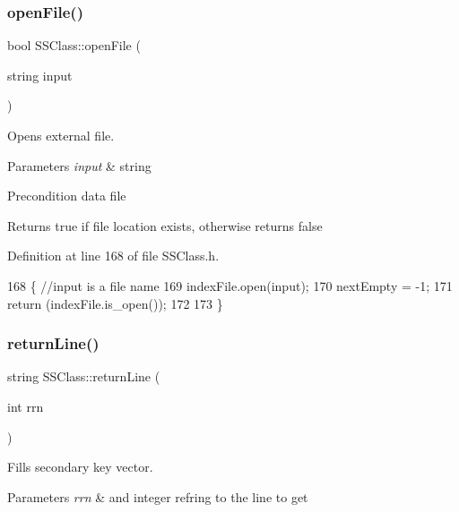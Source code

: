 \subsubsection{\texorpdfstring{open\+File()}{openFile()}}
{\footnotesize\ttfamily bool S\+S\+Class\+::open\+File (\begin{DoxyParamCaption}\item[{string}]{input }\end{DoxyParamCaption})}



Opens external file. 


\begin{DoxyParams}{Parameters}
{\em input} & string \\
\hline
\end{DoxyParams}
\begin{DoxyPrecond}{Precondition}
data file 
\end{DoxyPrecond}
\begin{DoxyReturn}{Returns}
true if file location exists, otherwise returns false 
\end{DoxyReturn}


Definition at line 168 of file S\+S\+Class.\+h.


\begin{DoxyCode}
168                                    \{ \textcolor{comment}{//input is a file name}
169     indexFile.open(input);
170     nextEmpty = -1;
171     \textcolor{keywordflow}{return} (indexFile.is\_open());
172 
173 \}
\end{DoxyCode}
\mbox{\label{classSSClass_ab0a8ea1af895df28359b5733bd920ef3}} 
\subsubsection{\texorpdfstring{return\+Line()}{returnLine()}}
{\footnotesize\ttfamily string S\+S\+Class\+::return\+Line (\begin{DoxyParamCaption}\item[{int}]{rrn }\end{DoxyParamCaption})}



Fills secondary key vector. 


\begin{DoxyParams}{Parameters}
{\em rrn} & and integer refring to the line to get \\
\hline
\end{DoxyParams}


